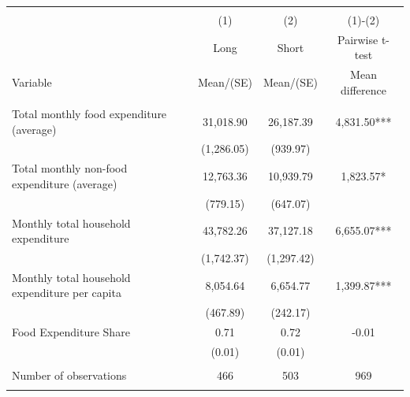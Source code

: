 
\begin{tabular}{@{\extracolsep{5pt}}lccc}
\\[-1.8ex]\hline \hline \\[-1.8ex]
 & \multicolumn{1}{c}{(1)}  & \multicolumn{1}{c}{(2)}  & \multicolumn{1}{c}{(1)-(2)} \\
 & \multicolumn{1}{c}{Long}  & \multicolumn{1}{c}{Short}  & \multicolumn{1}{c}{Pairwise t-test}  \\
Variable & Mean/(SE) & Mean/(SE) & Mean difference \\ \hline \\[-1.8ex] 
Total monthly food expenditure (average)   & 31,018.90    & 26,187.39    & 4,831.50***   \\
 & (1,286.05)  & (939.97)  &  \\ [1ex]
Total monthly non-food expenditure (average)   & 12,763.36    & 10,939.79    & 1,823.57*   \\
 & (779.15)  & (647.07)  &  \\ [1ex]
Monthly total household expenditure   & 43,782.26    & 37,127.18    & 6,655.07***   \\
 & (1,742.37)  & (1,297.42)  &  \\ [1ex]
Monthly total household expenditure per capita   & 8,054.64    & 6,654.77    & 1,399.87***   \\
 & (467.89)  & (242.17)  &  \\ [1ex]
Food Expenditure Share   & 0.71    & 0.72    & -0.01   \\
 & (0.01)  & (0.01)  &  \\ [1ex]
\hline \\[-1.8ex]
Number of observations  & 466   & 503  & 969  \\
\hline \hline \\[-1.8ex]

\end{tabular}
